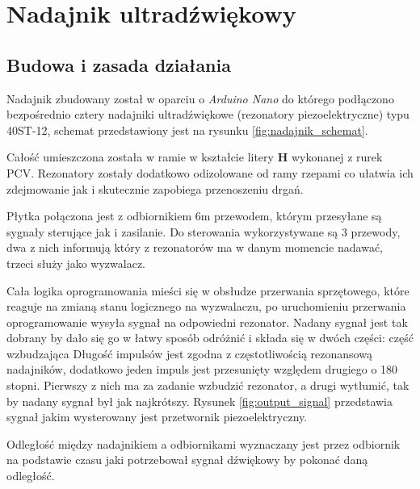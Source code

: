 \chapter{Nadajnik ultradźwiękowy}
\section{Budowa i zasada działania}

Nadajnik zbudowany został w oparciu o \textit{Arduino Nano} \cite{arduinoNano} do którego podłączono 
bezpośrednio cztery nadajniki ultradźwiękowe (rezonatory piezoelektryczne) typu 40ST-12, schemat 
przedstawiony jest na rysunku \ref{fig:nadajnik_schemat}.



Całość umieszczona została w ramie w kształcie litery \textbf{H} wykonanej z rurek PCV.
Rezonatory zostały dodatkowo odizolowane od ramy rzepami co ułatwia ich zdejmowanie jak i skutecznie
zapobiega przenoszeniu drgań.



Płytka połączona jest z odbiornikiem 6m przewodem, którym przesyłane są sygnały sterujące jak i zasilanie.
Do sterowania wykorzystywane są 3 przewody, dwa z nich informują który z rezonatorów ma w danym momencie nadawać,
trzeci służy jako wyzwalacz.

Cała logika oprogramowania mieści się w obsłudze przerwania sprzętowego, które reaguje na zmianą stanu logicznego
na wyzwalaczu,
po uruchomieniu przerwania oprogramowanie wysyła sygnał na odpowiedni rezonator. 
Nadany sygnał jest tak dobrany by dało się go w łatwy sposób odróżnić i składa się w dwóch
części: część wzbudzająca 
Długość impulsów jest zgodna z częstotliwością rezonansową nadajników, dodatkowo jeden
impuls jest przesunięty względem drugiego o 180 stopni. Pierwszy z nich ma za zadanie wzbudzić rezonator, a drugi wytłumić, 
tak by nadany sygnał był jak najkrótszy. 
Rysunek \ref{fig:output_signal} przedstawia sygnał jakim wysterowany jest przetwornik piezoelektryczny. 

Odległość między nadajnikiem a odbiornikami wyznaczany jest przez odbiornik na podstawie
czasu jaki potrzebował sygnał dźwiękowy by pokonać daną odległość.

